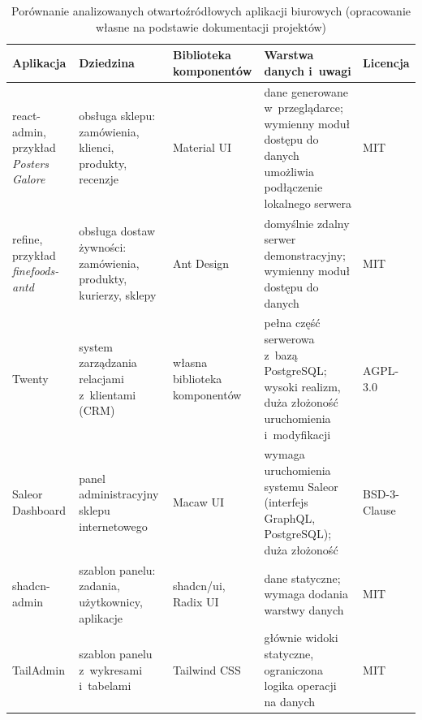\begin{table}[H]
\centering
\caption{Porównanie analizowanych otwartoźródłowych aplikacji biurowych (opracowanie własne na podstawie dokumentacji projektów)}
\label{tab:aplikacje}
\scriptsize
\begin{tabularx}{\textwidth}{>{\raggedright\arraybackslash}p{2.3cm}>{\raggedright\arraybackslash}p{2.6cm}>{\raggedright\arraybackslash}p{2.0cm}>{\raggedright\arraybackslash}X>{\raggedright\arraybackslash}p{1.3cm}}
\toprule
\textbf{Aplikacja} & \textbf{Dziedzina} & \textbf{Biblioteka komponentów} & \textbf{Warstwa danych i~uwagi} & \textbf{Licencja} \\
\midrule
react-admin, przykład \textit{Posters Galore} \citep{reactadmin} & obsługa sklepu: zamówienia, klienci, produkty, recenzje & Material UI & dane generowane w~przeglądarce; wymienny moduł dostępu do danych umożliwia podłączenie lokalnego serwera & MIT \\
\addlinespace
refine, przykład \textit{finefoods-antd} \citep{refine} & obsługa dostaw żywności: zamówienia, produkty, kurierzy, sklepy & Ant Design & domyślnie zdalny serwer demonstracyjny; wymienny moduł dostępu do danych & MIT \\
\addlinespace
Twenty \citep{twenty} & system zarządzania relacjami z~klientami (CRM) & własna biblioteka komponentów & pełna część serwerowa z~bazą PostgreSQL; wysoki realizm, duża złożoność uruchomienia i~modyfikacji & AGPL-3.0 \\
\addlinespace
Saleor Dashboard \citep{saleor} & panel administracyjny sklepu internetowego & Macaw UI & wymaga uruchomienia systemu Saleor (interfejs GraphQL, PostgreSQL); duża złożoność & BSD-3-Clause \\
\addlinespace
shadcn-admin \citep{shadcnadmin} & szablon panelu: zadania, użytkownicy, aplikacje & shadcn/ui, Radix UI & dane statyczne; wymaga dodania warstwy danych & MIT \\
\addlinespace
TailAdmin \citep{tailadmin} & szablon panelu z~wykresami i~tabelami & Tailwind CSS & głównie widoki statyczne, ograniczona logika operacji na danych & MIT \\
\bottomrule
\end{tabularx}
\end{table}

